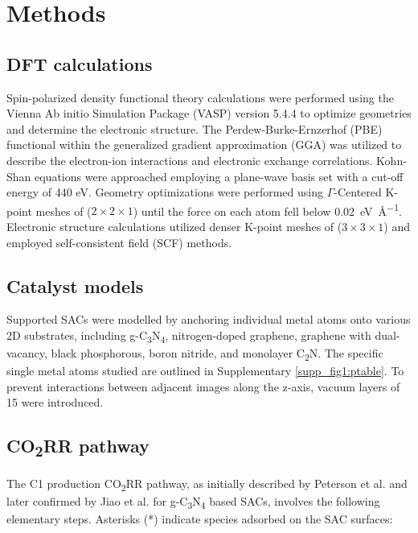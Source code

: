 \newpage
\section{Methods}

    \subsection{DFT calculations}
    Spin-polarized density functional theory calculations were performed using the Vienna Ab initio Simulation Package (VASP) version 5.4.4 \cite{kresse1996efficient, kresse1996efficiency, kresse1993ab} to optimize geometries and determine the electronic structure.
    The Perdew-Burke-Ernzerhof (PBE) functional \cite{kresse1996efficient} within the generalized gradient approximation (GGA) \cite{perdew1996generalized} was utilized to describe the electron-ion interactions and electronic exchange correlations.
    Kohn-Shan equations were approached employing a plane-wave basis set with a cut-off energy of 440 eV.
    Geometry optimizations were performed using $\Gamma$-Centered K-point meshes of ($2\times2\times1$) until the force on each atom fell below \SI{0.02}{\electronvolt\per\angstrom}.
    Electronic structure calculations utilized denser K-point meshes of ($3\times3\times1$) and employed self-consistent field (SCF) methods.


    \subsection{Catalyst models}
    Supported SACs were modelled by anchoring individual metal atoms onto various 2D substrates, including g-C\textsubscript{3}N\textsubscript{4}, nitrogen-doped graphene, graphene with dual-vacancy, black phosphorous, boron nitride, and monolayer C\textsubscript{2}N.
    The specific single metal atoms studied are outlined in Supplementary \cref{supp_fig1:ptable}.
    To prevent interactions between adjacent images along the z-axis, vacuum layers of 15 \text{\AA} were introduced.

    \subsection{CO\texorpdfstring{\textsubscript{2}}{2}RR pathway}
    The C1 production CO\textsubscript{2}RR pathway, as initially described by Peterson et al. \cite{peterson2010copper} and later confirmed by Jiao et al. \cite{jiao2017molecular} for
    g-C\textsubscript{3}N\textsubscript{4} based SACs, involves the following elementary steps.
    Asterisks (*) indicate species adsorbed on the SAC surfaces:


